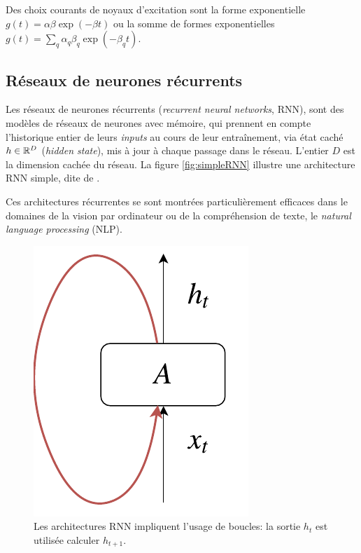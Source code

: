 \documentclass[../main.tex]{subfiles}
\begin{document}
Des choix courants de noyaux d'excitation sont la forme exponentielle $g(t) = \alpha\beta\exp(-\beta t)$ ou la somme de formes exponentielles $g(t) = \sum_q \alpha_q\beta_q\exp(-\beta_q t)$.

\subsection{Réseaux de neurones récurrents}

Les réseaux de neurones récurrents (\textit{recurrent neural networks}, RNN), sont des modèles de réseaux de neurones avec mémoire, qui prennent en compte l'historique entier de leurs \textit{inputs} au cours de leur entraînement, via état caché $h\in\mathbb{R}^D$ (\textit{hidden state}), mis à jour à chaque passage dans le réseau. L'entier $D$ est la dimension cachée du réseau. La figure \autoref{fig:simpleRNN} illustre une architecture RNN simple, dite de \citeauthor{elman1990srnn} \cite{elman1990srnn}.

Ces architectures récurrentes se sont montrées particulièrement efficaces dans le domaines de la vision par ordinateur ou de la compréhension de texte, le \textit{natural language processing} (NLP). \cite{unreasonableEffectivenessRNN}

\begin{figure}
	\centering
	\includegraphics[height=0.2\textheight]{diagrams/rnn.pdf}
	\caption{Les architectures RNN impliquent l'usage de boucles: la sortie $h_t$ est utilisée calculer $h_{t+1}$.}\label{fig:simpleRNN}
\end{figure}
\end{document}
